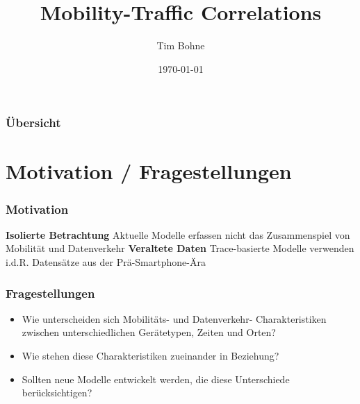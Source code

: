 \documentclass{beamer}
\title[]{Mobility-Traffic Correlations}
\author{Tim Bohne}
\institute[]
{
\textit{Bachelor-Seminar: Mobility and Traffic in Computer Networks}
\medskip
}
\date{\today}
\begin{document}
\begin{frame}[plain] %
\titlepage %
\end{frame}

\begin{frame}
\frametitle{Übersicht} %
\tableofcontents
\end{frame}

\section{Motivation / Fragestellungen}

\begin{frame}
  \frametitle{Motivation}
  \textit{} \cite{Alipour2018}
  \newline\newline
  \textbf{Isolierte Betrachtung}\newline
  Aktuelle Modelle erfassen nicht das Zusammenspiel von Mobilität und Datenverkehr\newline\newline
  \textbf{Veraltete Daten}\newline
  Trace-basierte Modelle verwenden i.d.R. Datensätze aus der Prä-Smartphone-Ära
\end{frame}

\begin{frame}
  \frametitle{Fragestellungen}
  \begin{itemize}
    \item Wie unterscheiden sich Mobilitäts- und Datenverkehr- Charakteristiken zwischen unterschiedlichen Gerätetypen,
    Zeiten und Orten?\newline
    \item Wie stehen diese Charakteristiken zueinander in Beziehung?\newline
    \item Sollten neue Modelle entwickelt werden, die diese Unterschiede berücksichtigen?
\end{itemize}
\end{frame}
\end{document}

